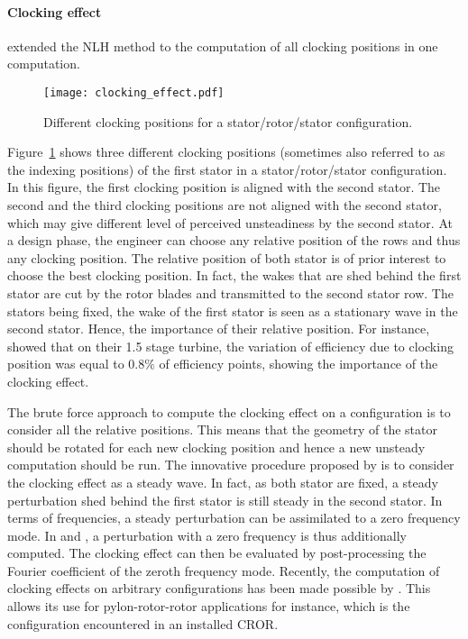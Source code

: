 \paragraph{Clocking effect}
\citet{He2002} extended the NLH method to
the computation of all clocking positions in one computation.
\begin{figure}[htp]
  \centering 
  \texttt{[image: clocking\_effect.pdf]}
  \caption{Different clocking positions for a stator/rotor/stator
  configuration.}
  \label{fig:sm_nlh_clocking_effect}
\end{figure}
Figure~\ref{fig:sm_nlh_clocking_effect} shows three
different clocking positions (sometimes also referred 
to as the indexing positions)
of the first stator
in a stator/rotor/stator configuration. In this figure,
the first clocking position is aligned with the second stator.
The second and the third clocking positions are not aligned with
the second stator, which may give different level of perceived
unsteadiness by the second stator. At a design phase, the engineer can choose any
relative position of the rows and thus any clocking position.
The relative position of both stator is of
prior interest to choose the best clocking position. 
In fact, the wakes that are shed behind the first stator
are cut by the rotor blades and transmitted to 
the second stator row. The stators being fixed, the wake of
the first stator is seen as a stationary wave in the second stator.
Hence, the importance of their relative position. For instance,
\citet{Huber1996} showed that
on their 1.5 stage turbine, the variation of efficiency due to clocking
position was equal to $0.8\%$ of efficiency points, showing the
importance of the clocking effect.

The brute force approach to compute the clocking effect on a
configuration is to consider all the relative positions. This means
that the geometry of the stator should be rotated for each new 
clocking position and hence a new unsteady computation should be 
run. The innovative procedure proposed by 
\citet{He2002} is to consider the clocking effect as a steady wave.
In fact, as both stator are fixed, a steady perturbation
shed behind the first stator is still steady in the second stator.
In terms of frequencies, a steady perturbation
can be assimilated to a zero frequency mode. 
In \citet{He2002} and \citet{Vilmin2009}, 
a perturbation with a zero frequency
is thus additionally computed. The clocking effect can then be evaluated by
post-processing the Fourier coefficient of the zeroth frequency mode.
Recently, the computation of clocking effects on
arbitrary configurations has been made possible
by \citet{Vilmin2013a}. This allows its use for 
pylon-rotor-rotor applications for instance, which
is the configuration encountered in an installed CROR.

